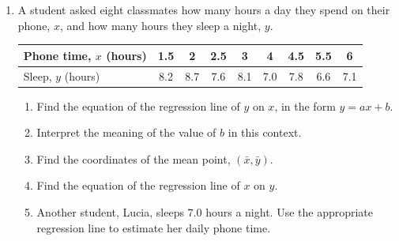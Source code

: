 \documentclass[12pt, twoside]{article}
\begin{document}
\begin{enumerate}[itemsep=0.15cm]

\newpage

\item[2.]

A student asked eight classmates how many hours a day they spend on their
phone, $x$, and how many hours they sleep a night, $y$.

\begin{center}
\setlength{\tabcolsep}{7pt}\renewcommand{\arraystretch}{1.2}
\begin{tabular}{|l|c|c|c|c|c|c|c|c|}
\hline
Phone time, $x$ (hours) & 1.5 & 2 & 2.5 & 3 & 4 & 4.5 & 5.5 & 6 \\
\hline
Sleep, $y$ (hours) & 8.2 & 8.7 & 7.6 & 8.1 & 7.0 & 7.8 & 6.6 & 7.1 \\
\hline
\end{tabular}
\end{center}

\begin{enumerate}[itemsep=0.1cm]
  \item Find the equation of the regression line of $y$ on $x$, in the
  form $y = ax + b$.
  \item Interpret the meaning of the value of $b$ in this context.
  \item Find the coordinates of the mean point, $(\bar{x}, \bar{y})$.
  \item Find the equation of the regression line of $x$ on $y$.
  \item Another student, Lucia, sleeps $7.0$ hours a night. Use the
  appropriate regression line to estimate her daily phone time.
\end{enumerate}


\end{enumerate}
\end{document}
